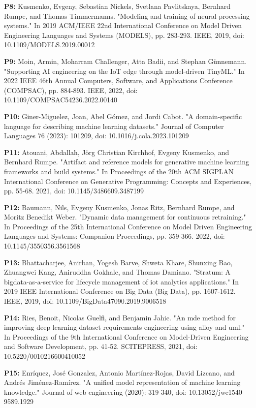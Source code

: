 \begin{footnotesize}
\textbf{P8:} Kusmenko, Evgeny, Sebastian Nickels, Svetlana Pavlitskaya, Bernhard Rumpe, and Thomas Timmermanns. "Modeling and training of neural processing systems." In 2019 ACM/IEEE 22nd International Conference on Model Driven Engineering Languages and Systems (MODELS), pp. 283-293. IEEE, 2019, doi: 10.1109/MODELS.2019.00012

\textbf{P9:} Moin, Armin, Moharram Challenger, Atta Badii, and Stephan Günnemann. "Supporting AI engineering on the IoT edge through model-driven TinyML." In 2022 IEEE 46th Annual Computers, Software, and Applications Conference (COMPSAC), pp. 884-893. IEEE, 2022, doi: 10.1109/COMPSAC54236.2022.00140

\textbf{P10: } Giner-Miguelez, Joan, Abel Gómez, and Jordi Cabot. "A domain-specific language for describing machine learning datasets." Journal of Computer Languages 76 (2023): 101209, doi: 10.1016/j.cola.2023.101209

\textbf{P11: } Atouani, Abdallah, Jörg Christian Kirchhof, Evgeny Kusmenko, and Bernhard Rumpe. "Artifact and reference models for generative machine learning frameworks and build systems." In Proceedings of the 20th ACM SIGPLAN International Conference on Generative Programming: Concepts and Experiences, pp. 55-68. 2021, doi: 10.1145/3486609.3487199

\textbf{P12: } Baumann, Nils, Evgeny Kusmenko, Jonas Ritz, Bernhard Rumpe, and Moritz Benedikt Weber. "Dynamic data management for continuous retraining." In Proceedings of the 25th International Conference on Model Driven Engineering Languages and Systems: Companion Proceedings, pp. 359-366. 2022, doi: 10.1145/3550356.3561568

\textbf{P13: } Bhattacharjee, Anirban, Yogesh Barve, Shweta Khare, Shunxing Bao, Zhuangwei Kang, Aniruddha Gokhale, and Thomas Damiano. "Stratum: A bigdata-as-a-service for lifecycle management of iot analytics applications." In 2019 IEEE International Conference on Big Data (Big Data), pp. 1607-1612. IEEE, 2019, doi: 10.1109/BigData47090.2019.9006518

\textbf{P14: } Ries, Benoit, Nicolas Guelfi, and Benjamin Jahic. "An mde method for improving deep learning dataset requirements engineering using alloy and uml." In Proceedings of the 9th International Conference on Model-Driven Engineering and Software Development, pp. 41-52. SCITEPRESS, 2021, doi: 10.5220/0010216600410052

\textbf{P15: } Enríquez, José Gonzalez, Antonio Martínez-Rojas, David Lizcano, and Andrés Jiménez-Ramírez. "A unified model representation of machine learning knowledge." Journal of web engineering (2020): 319-340, doi: 10.13052/jwe1540-9589.1929


\end{footnotesize}

